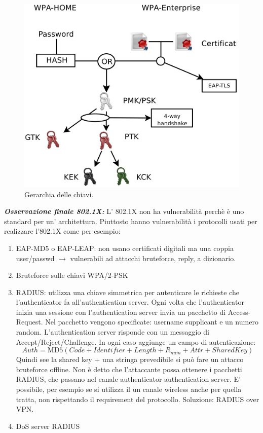 \begin{figure}[h]
	\centering
	\includegraphics[scale = 0.23]{images/key-hierarchy}
	\caption{Gerarchia delle chiavi.}
	\label{img:key-hierarchy}
\end{figure}

\textit{\textbf{Osservazione finale 802.1X:}} L' 802.1X non ha vulnerabilità perchè è uno standard per un' architettura. Piuttosto hanno vulnerabilità i protocolli usati per realizzare l'802.1X come per esempio:
\begin{enumerate}
\item EAP-MD5 o EAP-LEAP: non usano certificati digitali ma una coppia user/passwd $\rightarrow$ vulnerabili ad attacchi bruteforce, reply, a dizionario.
\item Bruteforce sulle chiavi WPA/2-PSK
\item RADIUS: utilizza una chiave simmetrica per autenticare le richieste che l’authenticator fa all’authentication server. Ogni volta che l’authenticator inizia una sessione con l’authentication server invia un pacchetto di Access-Request. Nel pacchetto vengono specificate: username supplicant e un numero random. L’authentication server risponde con un messaggio di Accept/Reject/Challenge. In ogni caso aggiunge un campo di autenticazione: 
$$ Auth = \text{MD5}(Code + Identifier + Length + R_{num} + Attr + Shared Key)$$
Quindi see la shared key + una stringa prevedibile si può fare un attacco bruteforce offline. Non è detto che l’attaccante possa ottenere i pacchetti RADIUS, che passano nel canale authenticator-authentication server. E' possibile, per esempio se si utilizza il un canale wireless anche per quella tratta, non rispettando il requirement del protocollo. Soluzione: RADIUS over VPN.
\item DoS server RADIUS
\end{enumerate}

